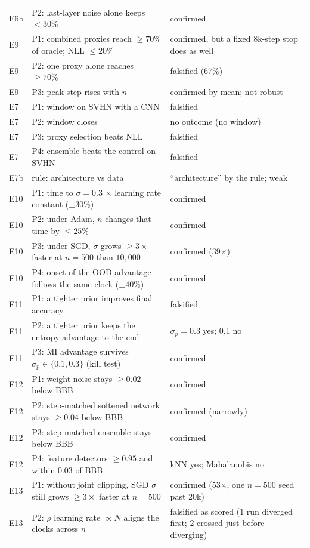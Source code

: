 \documentclass[11pt]{article}
\begin{document}
{\begin{longtable}{p{0.9cm}p{8.6cm}p{4.6cm}}
E6b & P2: last-layer noise alone keeps $<30\%$ & confirmed \\
E9 & P1: combined proxies reach $\ge70\%$ of oracle; NLL $\le20\%$ & confirmed, but a fixed 8k-step stop does as well \\
E9 & P2: one proxy alone reaches $\ge70\%$ & falsified (67\%) \\
E9 & P3: peak step rises with $n$ & confirmed by mean; not robust \\
E7 & P1: window on SVHN with a CNN & falsified \\
E7 & P2: window closes & no outcome (no window) \\
E7 & P3: proxy selection beats NLL & falsified \\
E7 & P4: ensemble beats the control on SVHN & falsified \\
E7b & rule: architecture vs data & ``architecture'' by the rule; weak \\
E10 & P1: time to $\sigma=0.3$ $\times$ learning rate constant ($\pm30\%$) & confirmed \\
E10 & P2: under Adam, $n$ changes that time by $\le25\%$ & confirmed \\
E10 & P3: under SGD, $\sigma$ grows $\ge3\times$ faster at $n=500$ than $10{,}000$ & confirmed (39$\times$) \\
E10 & P4: onset of the OOD advantage follows the same clock ($\pm40\%$) & confirmed \\
E11 & P1: a tighter prior improves final accuracy & falsified \\
E11 & P2: a tighter prior keeps the entropy advantage to the end & $\sigma_p=0.3$ yes; 0.1 no \\
E11 & P3: MI advantage survives $\sigma_p\in\{0.1, 0.3\}$ (kill test) & confirmed \\
E12 & P1: weight noise stays $\ge0.02$ below BBB & confirmed \\
E12 & P2: step-matched softened network stays $\ge0.04$ below BBB & confirmed (narrowly) \\
E12 & P3: step-matched ensemble stays below BBB & confirmed \\
E12 & P4: feature detectors $\ge0.95$ and within 0.03 of BBB & kNN yes; Mahalanobis no \\
E13 & P1: without joint clipping, SGD $\sigma$ still grows $\ge3\times$ faster at $n=500$ & confirmed (53$\times$, one $n=500$ seed past 20k) \\
E13 & P2: $\rho$ learning rate $\propto N$ aligns the clocks across $n$ & falsified as scored (1 run diverged first; 2 crossed just before diverging) \\

\end{longtable}}
\end{document}
